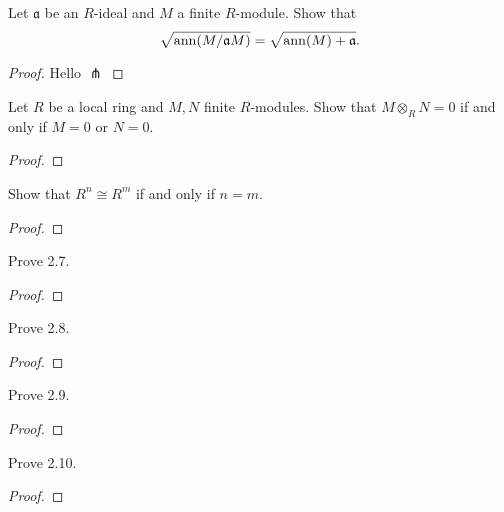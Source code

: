 \begin{problem}
Let $\mathfrak{a}$ be an $R$-ideal and $M$ a finite
$R$-module. Show that
\[
\sqrt{\operatorname{ann}(M/\mathfrak{a}M)}=\sqrt{\operatorname{ann}(M)+\mathfrak{a}}.
\]
\end{problem}
\begin{proof}
Hello $\pitchfork$
\end{proof}
\newpage
\begin{problem}
Let $R$ be a local ring and $M,N$ finite $R$-modules. Show that
$M\otimes_R N=0$ if and only if $M=0$ or $N=0$.
\end{problem}
\begin{proof}
\end{proof}
\newpage
\begin{problem}
Show that $R^n\cong R^m$ if and only if $n=m$.
\end{problem}
\begin{proof}
\end{proof}
\newpage
\begin{problem}
Prove 2.7.
\end{problem}
\begin{proof}
\end{proof}
\newpage
\begin{problem}
Prove 2.8.
\end{problem}
\begin{proof}
\end{proof}
\newpage
\begin{problem}
Prove 2.9.
\end{problem}
\begin{proof}
\end{proof}
\newpage
\begin{problem}
Prove 2.10.
\end{problem}
\begin{proof}
\end{proof}

